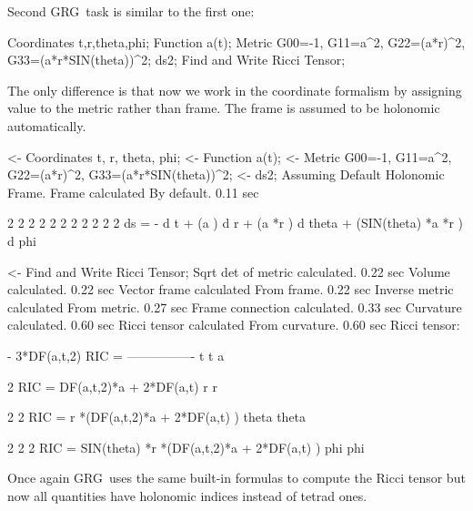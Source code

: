 \documentclass[twoside,openright]{report}
\newcommand{\grg}{{\sc GRG}}
\begin{document}
Second \grg\ task is similar to the first one:
\begin{listing}
   Coordinates t,r,theta,phi;
   Function a(t);
   Metric G00=-1, G11=a^2, G22=(a*r)^2, G33=(a*r*SIN(theta))^2;
   ds2;
   Find and Write Ricci Tensor;
\end{listing}
The only difference is that now we work in the coordinate
formalism by assigning value to the metric rather than
frame. The frame is assumed to be holonomic automatically.
\begin{slisting}
<- Coordinates t, r, theta, phi;
<- Function a(t);
<- Metric G00=-1, G11=a^2, G22=(a*r)^2, G33=(a*r*SIN(theta))^2;
<- ds2;
Assuming Default Holonomic Frame.
Frame calculated By default. 0.11 sec

   2          2     2     2     2  2         2              2  2  2       2
 ds  =  -  d t  + (a ) d r  + (a *r ) d theta  + (SIN(theta) *a *r ) d phi

<- Find and Write Ricci Tensor;
Sqrt det of metric calculated. 0.22 sec
Volume calculated. 0.22 sec
Vector frame calculated From frame. 0.22 sec
Inverse metric calculated From metric. 0.27 sec
Frame connection calculated. 0.33 sec
Curvature calculated. 0.60 sec
Ricci tensor calculated From curvature. 0.60 sec
Ricci tensor:

            - 3*DF(a,t,2)
RIC     = ----------------
    t t          a

                                 2
RIC     = DF(a,t,2)*a + 2*DF(a,t)
    r r

                   2                         2
RIC             = r *(DF(a,t,2)*a + 2*DF(a,t) )
    theta theta

                        2  2                         2
RIC         = SIN(theta) *r *(DF(a,t,2)*a + 2*DF(a,t) )
    phi phi
\end{slisting}
Once again \grg\ uses the same built-in formulas to compute
the Ricci tensor but now all quantities have holonomic
indices instead of tetrad ones.
\end{document}
